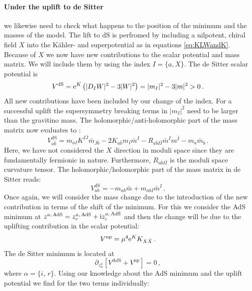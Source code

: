 \documentclass[a4paper,12pt,twoside,openright]{report}
\newcommand{\be}{\begin{equation}}
\newcommand{\ee}{\end{equation}}
\def\rmi{{\rm i}}
\def\rme{{\rm e}}
\begin{document}
\paragraph{Under the uplift to de Sitter} we likewise need to check what happens to the position of the minimum and the masses of the model. The lift to dS is perfromed by including a nilpotent, chiral field $X$ into the Kähler- and superpotential as in equations \eqref{eq:KLWandK}. Because of $X$ we now have new contributions to the scalar potential and mass matrix. We will include them by using the index $I = \{a,X\}$. The de Sitter scalar potential is
\be 
V^{\text{dS}} = \rme^K \left(|D_IW|^2-3|W|^2\right) = |m_I|^2 - 3 |m|^2 >0\,.
\ee
All new contributions have been included by our change of the index. For a successful uplift the supersymmetry breaking terms in $|m_I|^2$ need to be larger than the gravitino mass. The holomorphic/anti-holomorphic part of the mass matrix now evaluates to \cite{Denef:2004ze,Kallosh:2014oja}:
\be 
V_{a\bar{b}}^{\text{dS}}=m_{aI} K^{I\bar{J}} \bar{m}_{\bar{J}\bar{b}} - 2 K_{a\bar{b}}m_I \bar{m}^I - R_{a\bar{b}I\bar{I}} \bar{m}^I m^{\bar{I}} - m_a \bar{m}_{\bar{b}}\,.
\label{eq:dSmassmatrix}
\ee
Here, we have not considered the $X$ direction in moduli space since they are fundamentally fermionic in nature. Furthermore, $R_{a\bar{b}I\bar{I}}$ is the moduli space curvature tensor. The holomorphic/holomorphic part of the mass matrix in de Sitter reads:
\be 
V_{ab}^{\text{dS}} = -m_{ab}\bar{m} + m_{abI} \bar{m}^I\,.
\ee
Once again, we will consider the mass change due to the introduction of the new contribution in terms of the shift of the minimum. For this we consider the AdS minimum at $z^{a,\,\text{AdS}} = z^{a,\,\text{AdS}}_{r} + \rmi z^{a,\,\text{AdS}}_{i}$ and then the change will be due to the uplifting contribution in the scalar potential:
\be 
V^{\text{up}} = \mu^4 \rme^K K_{X\bar{X}}\,.
\ee
The de Sitter minimum is located at 
\be 
\partial_{z^ a_{\alpha}} \left[V^{\text{AdS}} + V^{\text{up}}\right] =0\,,
\ee
where $\alpha = \{i,\,r\}$. Using our knowledge about the AdS minimum and the uplift potential we find for the two terms individually:
\end{document}
